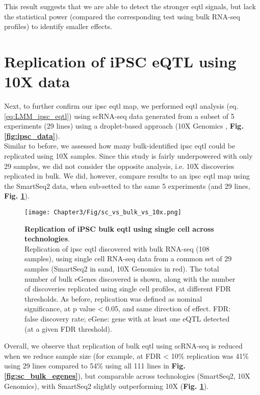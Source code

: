 This result suggests that we are able to detect the stronger \gls{eqtl} signals, but lack the statistical power (compared the corresponding test using bulk RNA-seq profiles) to identify smaller effects.


\section{Replication of iPSC eQTL using 10X data}

Next, to further confirm our \gls{ipsc} \gls{eqtl} map, we performed \gls{eqtl} analysis (eq. \eqref{eq:LMM_ipsc_eqtl}) using scRNA-seq data generated from a subset of 5 experiments (29 lines) using a droplet-based approach (10X Genomics \cite{zheng2017massively}, \textbf{Fig. \ref{fig:ipsc_data}}).\\

Similar to before, we assessed how many bulk-identified \gls{ipsc} \gls{eqtl} could be replicated using 10X samples.
Since this study is fairly underpowered with only 29 samples, we did not consider the opposite analysis, i.e. 10X discoveries replicated in bulk.
We did, however, compare results to an \gls{ipsc} \gls{eqtl} map using the SmartSeq2 data, when sub-setted to the same 5 experiments (and 29 lines, \textbf{Fig. \ref{fig:sc_bulk_10x_egenes}}). 

\begin{figure}[h]
\texttt{[image: Chapter3/Fig/sc\_vs\_bulk\_vs\_10x.png]}
\caption[iPSC bulk eQTL replication]{\textbf{Replication of iPSC bulk \gls{eqtl} using single cell across technologies}.\\
Replication of \gls{ipsc} \gls{eqtl} discovered with bulk RNA-seq (108 samples), using single cell RNA-seq data from a common set of 29 samples (SmartSeq2 in sand, 10X Genomics in red). 
The total number of bulk eGenes discovered is shown, along with the number of discoveries replicated using single cell profiles, at different FDR thresholds. 
As before, replication was defined as nominal significance, at p value < 0.05, and same direction of effect.
FDR: false discovery rate; eGene: gene with at least one eQTL detected (at a given FDR threshold).}
\label{fig:sc_bulk_10x_egenes}
\end{figure}

Overall, we observe that replication of bulk \gls{eqtl} using scRNA-seq is reduced when we reduce sample size (for example, at FDR < 10\% replication was 41\% using 29 lines compared to 54\% using all 111 lines in \textbf{Fig. \ref{fig:sc_bulk_egenes}}), but comparable across technologies (SmartSeq2, 10X Genomics), with SmartSeq2 slightly outperforming 10X (\textbf{Fig. \ref{fig:sc_bulk_10x_egenes}}).
\\

